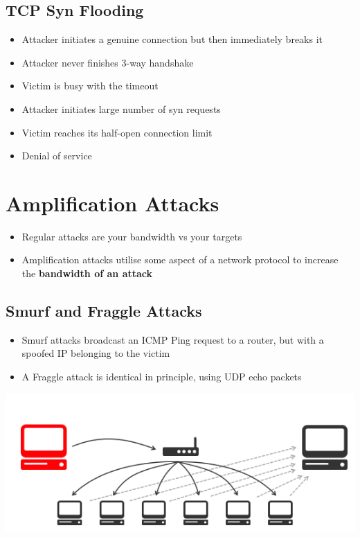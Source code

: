 \documentclass{article}
\begin{document}
\subsection{TCP Syn Flooding}
\begin{itemize}
  \item Attacker initiates a genuine connection but then immediately breaks it 
  \item Attacker never finishes 3-way handshake 
  \item Victim is busy with the timeout 
  \item Attacker initiates large number of syn requests 
  \item Victim reaches its half-open connection limit 
  \item Denial of service
\end{itemize}

\section{Amplification Attacks}
\begin{itemize}
  \item Regular attacks are your bandwidth vs your targets 
  \item Amplification attacks utilise some aspect of a network protocol to increase the \textbf{bandwidth of an attack}
\end{itemize}

\subsection{Smurf and Fraggle Attacks}
\begin{itemize}
  \item Smurf attacks broadcast an ICMP Ping request to a router, but with a spoofed IP belonging to the victim 
  \item A Fraggle attack is identical in principle, using UDP echo packets
\end{itemize}
\begin{center}
  \includegraphics[scale=0.5]{smur.png}
\end{center}
\end{document}
